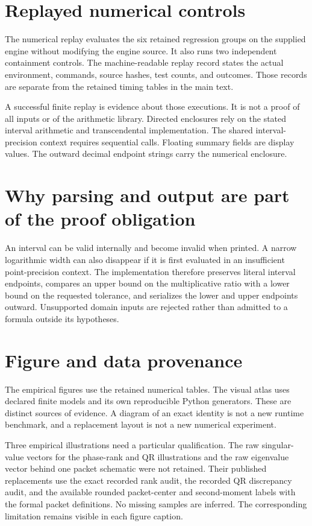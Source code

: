 \section{Replayed numerical controls}\label{app:fresh-validation}
The numerical replay evaluates the six retained regression groups on the
supplied engine without modifying the engine source. It also runs two
independent containment controls. The machine-readable replay record states
the actual environment, commands, source hashes, test counts, and outcomes.
Those records are separate from the retained timing tables in the main text.



A successful finite replay is evidence about those executions. It is not a
proof of all inputs or of the arithmetic library. Directed enclosures rely on
the stated interval arithmetic and transcendental implementation. The shared
interval-precision context requires sequential calls. Floating summary fields
are display values. The outward decimal endpoint strings carry the numerical
enclosure.

\section{Why parsing and output are part of the proof obligation}
An interval can be valid internally and become invalid when printed. A narrow
logarithmic width can also disappear if it is first evaluated in an
insufficient point-precision context. The implementation therefore preserves
literal interval endpoints, compares an upper bound on the multiplicative
ratio with a lower bound on the requested tolerance, and serializes the lower
and upper endpoints outward. Unsupported domain inputs are rejected rather
than admitted to a formula outside its hypotheses.

\section{Figure and data provenance}\label{app:provenance}
The empirical figures use the retained numerical tables. The visual atlas
uses declared finite models and its own reproducible Python generators.
These are distinct sources of evidence. A diagram of an exact identity is
not a new runtime benchmark, and a replacement layout is not a new numerical
experiment.

Three empirical illustrations need a particular qualification. The raw
singular-value vectors for the phase-rank and QR illustrations and the raw
eigenvalue vector behind one packet schematic were not retained. Their
published replacements use the exact recorded rank audit, the recorded QR
discrepancy audit, and the available rounded packet-center and second-moment
labels with the formal packet definitions. No missing samples are inferred.
The corresponding limitation remains visible in each figure caption.

